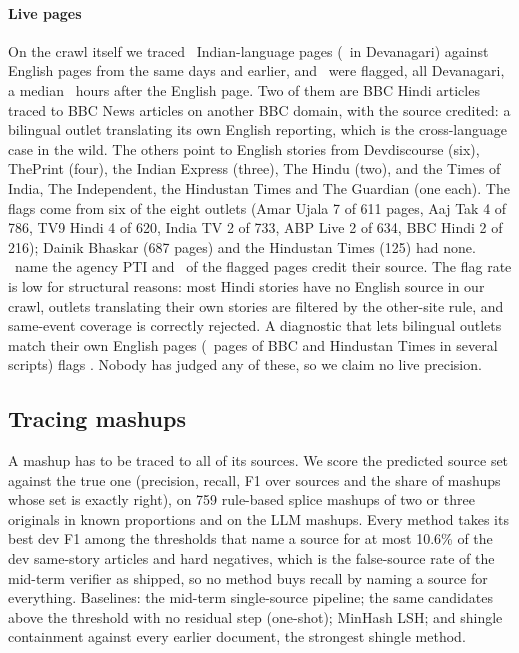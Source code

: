 \documentclass[11pt,a4paper]{article}
\begin{document}
\paragraph{Live pages}
On the crawl itself we traced \nXlLiveSuspects\ Indian-language pages (\nXlLiveDeva\ in Devanagari) against English pages from the same days and earlier, and \nXlLiveFlagged\ were flagged, all Devanagari, a median \nXlLiveLag\ hours after the English page. Two of them are BBC Hindi articles traced to BBC News articles on another BBC domain, with the source credited: a bilingual outlet translating its own English reporting, which is the cross-language case in the wild. The others point to English stories from Devdiscourse (six), ThePrint (four), the Indian Express (three), The Hindu (two), and the Times of India, The Independent, the Hindustan Times and The Guardian (one each). The flags come from six of the eight outlets (Amar Ujala 7 of 611 pages, Aaj Tak 4 of 786, TV9 Hindi 4 of 620, India TV 2 of 733, ABP Live 2 of 634, BBC Hindi 2 of 216); Dainik Bhaskar (687 pages) and the Hindustan Times (125) had none. \nXlLiveAgency\ name the agency PTI and \nXlLiveCredit\ of the flagged pages credit their source. The flag rate is low for structural reasons: most Hindi stories have no English source in our crawl, outlets translating their own stories are filtered by the other-site rule, and same-event coverage is correctly rejected. A diagnostic that lets bilingual outlets match their own English pages (\nSameSiteSuspects\ pages of BBC and Hindustan Times in several scripts) flags \nSameSiteFlagged. Nobody has judged any of these, so we claim no live precision.

\subsection{Tracing mashups}
\label{sec:ms}

A mashup has to be traced to all of its sources. We score the predicted source set against the true one (precision, recall, F1 over sources and the share of mashups whose set is exactly right), on 759 rule-based splice mashups of two or three originals in known proportions and on the LLM mashups. Every method takes its best dev F1 among the thresholds that name a source for at most 10.6\% of the dev same-story articles and hard negatives, which is the false-source rate of the mid-term verifier as shipped, so no method buys recall by naming a source for everything. Baselines: the mid-term single-source pipeline; the same candidates above the threshold with no residual step (one-shot); MinHash LSH; and shingle containment against every earlier document, the strongest shingle method.
\end{document}
